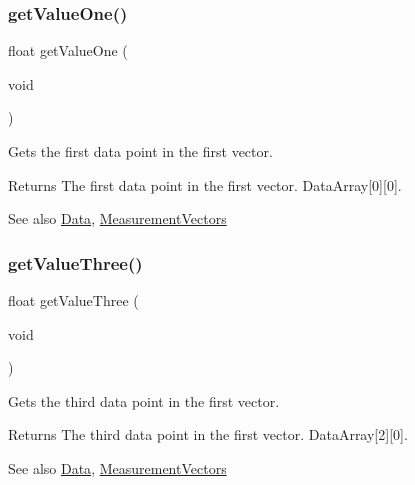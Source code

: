 \subsubsection{\texorpdfstring{getValueOne()}{getValueOne()}}
{\footnotesize\ttfamily float get\+Value\+One (\begin{DoxyParamCaption}\item[{void}]{ }\end{DoxyParamCaption})}



Gets the first data point in the first vector. 

\begin{DoxyReturn}{Returns}
The first data point in the first vector. Data\+Array\mbox{[}0\mbox{]}\mbox{[}0\mbox{]}. 
\end{DoxyReturn}
\begin{DoxySeeAlso}{See also}
\mbox{\hyperlink{struct_data}{Data}}, \mbox{\hyperlink{_s_p_i___instruction_set_8h_a9d8048399836e11887f85cc8dc3d75d5}{Measurement\+Vectors}} 
\end{DoxySeeAlso}
\mbox{\label{class_data_source_ad7870f61cbf33ac7a284b47930ff5bcf}} 
\subsubsection{\texorpdfstring{getValueThree()}{getValueThree()}}
{\footnotesize\ttfamily float get\+Value\+Three (\begin{DoxyParamCaption}\item[{void}]{ }\end{DoxyParamCaption})}



Gets the third data point in the first vector. 

\begin{DoxyReturn}{Returns}
The third data point in the first vector. Data\+Array\mbox{[}2\mbox{]}\mbox{[}0\mbox{]}. 
\end{DoxyReturn}
\begin{DoxySeeAlso}{See also}
\mbox{\hyperlink{struct_data}{Data}}, \mbox{\hyperlink{_s_p_i___instruction_set_8h_a9d8048399836e11887f85cc8dc3d75d5}{Measurement\+Vectors}} 
\end{DoxySeeAlso}
\mbox{\label{class_data_source_accbfa79e7afee154b4332483181f27ec}} 
